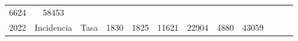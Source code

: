 \begin{tabular}{ccc|cccccc|lll}
		\multicolumn{1}{c|}{\cellcolor[HTML]{C1EFC0}6624} &
		\cellcolor[HTML]{C1EFC0}58453 &
		&
		&
		\\ \cline{3-9}
		\multicolumn{1}{|c|}{\multirow{-5}{*}{\cellcolor[HTML]{C1EFC0}2022}} &
		\multicolumn{1}{c|}{\cellcolor[HTML]{C1EFC0}Incidencia} &
		\cellcolor[HTML]{C1EFC0}Tasa &
		\multicolumn{1}{c|}{\cellcolor[HTML]{C1EFC0}1830} &
		\multicolumn{1}{c|}{\cellcolor[HTML]{C1EFC0}1825} &
		\multicolumn{1}{c|}{\cellcolor[HTML]{C1EFC0}11621} &
		\multicolumn{1}{c|}{\cellcolor[HTML]{C1EFC0}22904} &
		\multicolumn{1}{c|}{\cellcolor[HTML]{C1EFC0}4880} &
		\cellcolor[HTML]{C1EFC0}43059 &
		&
		&
		\\ \cline{1-1} \cline{3-9}
	\end{tabular}